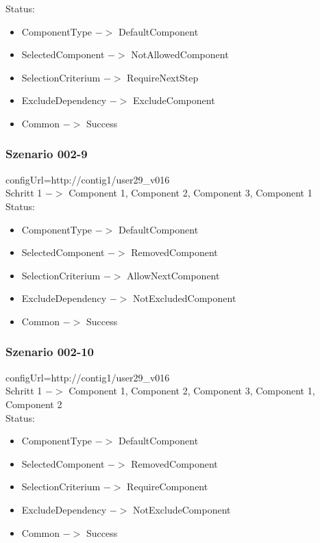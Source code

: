 \documentclass{article}
\begin{document}
\noindent Status:

\begin{itemize}
  \item ComponentType $->$ DefaultComponent
  \item SelectedComponent $->$ NotAllowedComponent
  \item SelectionCriterium $->$ RequireNextStep
  \item ExcludeDependency $->$ ExcludeComponent
  \item Common $->$ Success
\end{itemize}

\subsubsection{Szenario 002-9}

configUrl=http://contig1/user29\_v016\\

\noindent Schritt 1 $->$ Component 1, Component 2, Component 3, Component 1\\

\noindent Status:

\begin{itemize}
  \item ComponentType $->$ DefaultComponent
  \item SelectedComponent $->$ RemovedComponent
  \item SelectionCriterium $->$ AllowNextComponent
  \item ExcludeDependency $->$ NotExcludedComponent
  \item Common $->$ Success
\end{itemize}

\subsubsection{Szenario 002-10}

configUrl=http://contig1/user29\_v016\\

\noindent Schritt 1 $->$ Component 1, Component 2, Component 3, Component 1,
Component 2\\

\noindent Status:

\begin{itemize}
  \item ComponentType $->$ DefaultComponent
  \item SelectedComponent $->$ RemovedComponent
  \item SelectionCriterium $->$ RequireComponent
  \item ExcludeDependency $->$ NotExcludeComponent
  \item Common $->$ Success
\end{itemize}
\end{document}
